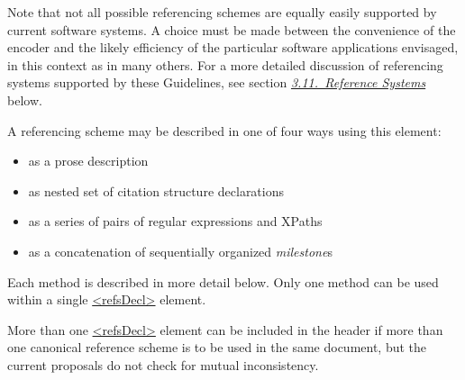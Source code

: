  Note that not all possible referencing schemes are equally easily supported by current software systems. A choice must be made between the convenience of the encoder and the likely efficiency of the particular software applications envisaged, in this context as in many others. For a more detailed discussion of referencing systems supported by these Guidelines, see section \textit{\hyperref[CORS]{3.11.\ Reference Systems}} below.\par
A referencing scheme may be described in one of four ways using this element: \begin{itemize}
\item as a prose description
\item as nested set of citation structure declarations
\item as a series of pairs of regular expressions and XPaths
\item as a concatenation of sequentially organized \textit{milestone}s
\end{itemize}  Each method is described in more detail below. Only one method can be used within a single \hyperref[TEI.refsDecl]{<refsDecl>} element.\par
More than one \hyperref[TEI.refsDecl]{<refsDecl>} element can be included in the header if more than one canonical reference scheme is to be used in the same document, but the current proposals do not check for mutual inconsistency.
